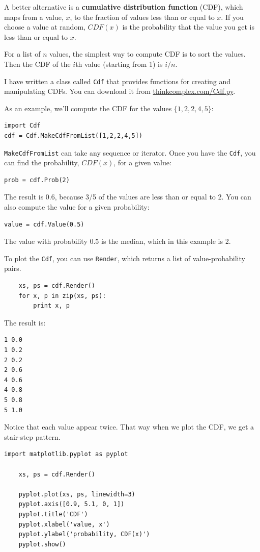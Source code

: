 \documentclass[10pt]{book}
\begin{document}
A better alternative is a {\bf cumulative distribution function}
(CDF), which maps from a value, $x$, to the fraction of values less
than or equal to $x$.  If you choose a value at random, $CDF(x)$
is the probability that the value you get is less
than or equal to $x$.

For a list of $n$ values, the simplest way to compute CDF is to
sort the values.  Then the CDF of the $i$th value (starting from 1)
is $i/n$.

I have written a class called {\tt Cdf} that provides functions
for creating and manipulating CDFs.  You can download it from
\url{thinkcomplex.com/Cdf.py}.

As an example, we'll compute the CDF for the values $\{1,2,2,4,5\}$:

\begin{verbatim}
import Cdf
cdf = Cdf.MakeCdfFromList([1,2,2,4,5])
\end{verbatim}

{\tt MakeCdfFromList} can take any sequence or iterator.
Once you have the {\tt Cdf}, you can find the probability, $CDF(x)$, for
a given value:

\begin{verbatim}
prob = cdf.Prob(2)
\end{verbatim}

The result is 0.6, because 3/5 of the values are less than or equal to 2.
You can also compute the value for a given probability:

\begin{verbatim}
value = cdf.Value(0.5)
\end{verbatim}

The value with probability 0.5 is the median, which in this example is 2.

To plot the {\tt Cdf}, you can use {\tt Render}, which returns
a list of value-probability pairs.

\begin{verbatim}
    xs, ps = cdf.Render()
    for x, p in zip(xs, ps):
        print x, p
\end{verbatim}

The result is:

\begin{verbatim}
1 0.0
1 0.2
2 0.2
2 0.6
4 0.6
4 0.8
5 0.8
5 1.0
\end{verbatim}

Notice that each value appear twice.  That way when we plot the
CDF, we get a stair-step pattern.

\begin{verbatim}
import matplotlib.pyplot as pyplot

    xs, ps = cdf.Render()

    pyplot.plot(xs, ps, linewidth=3)
    pyplot.axis([0.9, 5.1, 0, 1])
    pyplot.title('CDF')
    pyplot.xlabel('value, x')
    pyplot.ylabel('probability, CDF(x)')
    pyplot.show()
\end{verbatim}
\end{document}
